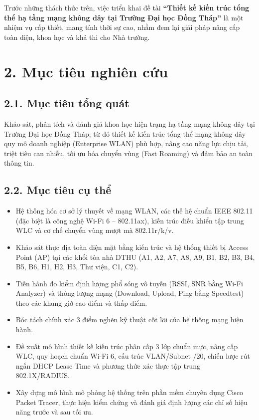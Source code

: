 Trước những thách thức trên, việc triển khai đề tài \textbf{“Thiết kế kiến trúc tổng thể hạ tầng mạng không dây tại Trường Đại học Đồng Tháp”} là một nhiệm vụ cấp thiết, mang tính thời sự cao, nhằm đem lại giải pháp nâng cấp toàn diện, khoa học và khả thi cho Nhà trường.

\section*{2. Mục tiêu nghiên cứu}

\subsection*{2.1. Mục tiêu tổng quát}
Khảo sát, phân tích và đánh giá khoa học hiện trạng hạ tầng mạng không dây tại Trường Đại học Đồng Tháp; từ đó thiết kế kiến trúc tổng thể mạng không dây quy mô doanh nghiệp (Enterprise WLAN) phù hợp, nâng cao năng lực chịu tải, triệt tiêu can nhiễu, tối ưu hóa chuyển vùng (Fast Roaming) và đảm bảo an toàn thông tin.

\subsection*{2.2. Mục tiêu cụ thể}
\begin{itemize}
    \item Hệ thống hóa cơ sở lý thuyết về mạng WLAN, các thế hệ chuẩn IEEE 802.11 (đặc biệt là công nghệ Wi-Fi 6 -- 802.11ax), kiến trúc điều khiển tập trung WLC và cơ chế chuyển vùng mượt mà 802.11r/k/v.
    \item Khảo sát thực địa toàn diện mặt bằng kiến trúc và hệ thống thiết bị Access Point (AP) tại các khối tòa nhà DTHU (A1, A2, A7, A8, A9, B1, B2, B3, B4, B5, B6, H1, H2, H3, Thư viện, C1, C2).
    \item Tiến hành đo kiểm định lượng phổ sóng vô tuyến (RSSI, SNR bằng Wi-Fi Analyzer) và thông lượng mạng (Download, Upload, Ping bằng Speedtest) theo các khung giờ cao điểm và thấp điểm.
    \item Bóc tách chính xác 3 điểm nghẽn kỹ thuật cốt lõi của hệ thống mạng hiện hành.
    \item Đề xuất mô hình thiết kế kiến trúc phân cấp 3 lớp chuẩn mực, nâng cấp WLC, quy hoạch chuẩn Wi-Fi 6, cấu trúc VLAN/Subnet /20, chiến lược rút ngắn DHCP Lease Time và phương thức xác thực tập trung 802.1X/RADIUS.
    \item Xây dựng mô hình mô phỏng hệ thống trên phần mềm chuyên dụng Cisco Packet Tracer, thực hiện kiểm chứng và đánh giá định lượng các chỉ số hiệu năng trước và sau tối ưu.
\end{itemize}

